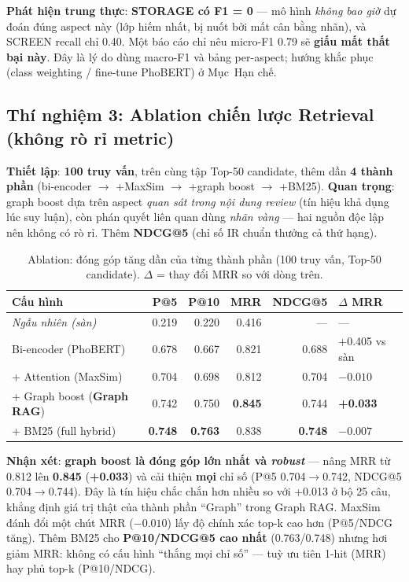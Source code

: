 \documentclass[12pt,a4paper]{article}
\begin{document}
\noindent\textbf{Phát hiện trung thực}: \textbf{STORAGE có F1 = 0} --- mô hình \textit{không bao giờ} dự đoán đúng aspect này (lớp hiếm nhất, bị nuốt bởi mất cân bằng nhãn), và SCREEN recall chỉ 0.40. Một báo cáo chỉ nêu micro-F1 0.79 sẽ \textbf{giấu mất thất bại này}. Đây là lý do dùng macro-F1 và bảng per-aspect; hướng khắc phục (class weighting / fine-tune PhoBERT) ở Mục~Hạn chế.

\subsection{Thí nghiệm 3: Ablation chiến lược Retrieval (không rò rỉ metric)}

\textbf{Thiết lập}: \textbf{100 truy vấn}, trên cùng tập Top-50 candidate, thêm dần \textbf{4 thành phần} (bi-encoder $\to$ +MaxSim $\to$ +graph boost $\to$ +BM25). \textbf{Quan trọng}: graph boost dựa trên aspect \textit{quan sát trong nội dung review} (tín hiệu khả dụng lúc suy luận), còn phán quyết liên quan dùng \textit{nhãn vàng} --- hai nguồn độc lập nên không có rò rỉ. Thêm \textbf{NDCG@5} (chỉ số IR chuẩn thưởng cả thứ hạng).

\begin{table}[H]
\centering
\caption{Ablation: đóng góp tăng dần của từng thành phần (100 truy vấn, Top-50 candidate). $\Delta$ = thay đổi MRR so với dòng trên.}
\begin{tabular}{lrrrrl}
\toprule
\textbf{Cấu hình} & \textbf{P@5} & \textbf{P@10} & \textbf{MRR} & \textbf{NDCG@5} & \textbf{$\Delta$ MRR} \\
\midrule
\textit{Ngẫu nhiên (sàn)} & 0.219 & 0.220 & 0.416 & --- & --- \\
Bi-encoder (PhoBERT)            & 0.678 & 0.667 & 0.821 & 0.688 & +0.405 vs sàn \\
\quad + Attention (MaxSim)      & 0.704 & 0.698 & 0.812 & 0.704 & $-0.010$ \\
\quad + Graph boost (\textbf{Graph RAG}) & 0.742 & 0.750 & \textbf{0.845} & 0.744 & \textbf{+0.033} \\
\quad + BM25 (full hybrid)      & \textbf{0.748} & \textbf{0.763} & 0.838 & \textbf{0.748} & $-0.007$ \\
\bottomrule
\end{tabular}
\end{table}

\noindent\textbf{Nhận xét}: \textbf{graph boost là đóng góp lớn nhất và \textit{robust}} --- nâng MRR từ 0.812 lên \textbf{0.845} (\textbf{+0.033}) và cải thiện \textbf{mọi} chỉ số (P@5 0.704$\to$0.742, NDCG@5 0.704$\to$0.744). Đây là tín hiệu chắc chắn hơn nhiều so với +0.013 ở bộ 25 câu, khẳng định giá trị thật của thành phần ``Graph'' trong Graph RAG. MaxSim đánh đổi một chút MRR ($-0.010$) lấy độ chính xác top-k cao hơn (P@5/NDCG tăng). Thêm BM25 cho \textbf{P@10/NDCG@5 cao nhất} (0.763/0.748) nhưng hơi giảm MRR: không có cấu hình ``thắng mọi chỉ số'' --- tuỳ ưu tiên 1-hit (MRR) hay phủ top-k (P@10/NDCG).
\end{document}
